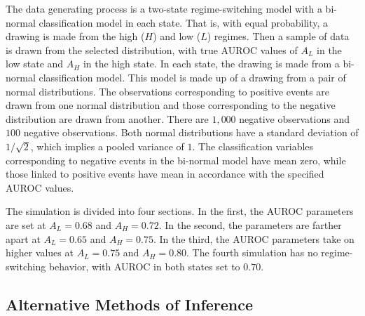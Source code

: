 The data generating process is a two-state regime-switching model with a bi-normal classification model in each state.
That is, with equal probability, a drawing is made from the high ($H$) and low ($L$) regimes.
Then a sample of data is drawn from the selected distribution, with true AUROC values of $A_L$ in the low state and $A_H$ in the high state.
In each state, the drawing is made from a bi-normal classification model.
This model is made up of a drawing from a pair of normal distributions.
The observations corresponding to positive events are drawn from one normal distribution and those corresponding to the negative distribution are drawn from another.
There are $1,000$ negative observations and $100$ negative observations.
Both normal distributions have a standard deviation of $1/\sqrt{2}$, which implies a pooled variance of $1$.
The classification variables corresponding to negative events in the bi-normal model have mean zero, while those linked to positive events have mean in accordance with the specified AUROC values.

The simulation is divided into four sections.
In the first, the AUROC parameters are set at $A_L = 0.68$ and $A_H = 0.72$.
In the second, the parameters are farther apart at $A_L = 0.65$ and $A_H = 0.75$.
In the third, the AUROC parameters take on higher values at $A_L = 0.75$ and $A_H = 0.80$.
The fourth simulation has no regime-switching behavior, with AUROC in both states set to $0.70$.


\subsection{Alternative Methods of Inference}


